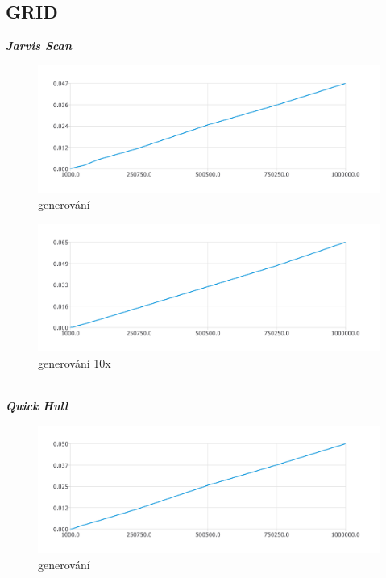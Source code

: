 \documentclass{article}
\begin{document}
\subsection{GRID}
\textit{\textbf {Jarvis Scan}}
\\
\begin{figure}[htbp]
\centering
        \includegraphics[clip, trim=0cm 0cm 0cm 0cm, width=1\textwidth]{pdf10.pdf}
        \caption{generování}
\end{figure}
\begin{figure}[htbp]
\centering
        \includegraphics[clip, trim=0cm 0cm 0cm 0cm, width=1\textwidth]{grj.pdf}
        \caption{generování 10x}
\end{figure}
\\
\clearpage
\newpage
\textit{\textbf {Quick Hull}}
\\
\begin{figure}[htbp]
\centering
        \includegraphics[clip, trim=0cm 0cm 0cm 0cm, width=1\textwidth]{pdf13.pdf}
        \caption{generování}
\end{figure}
\end{document}
